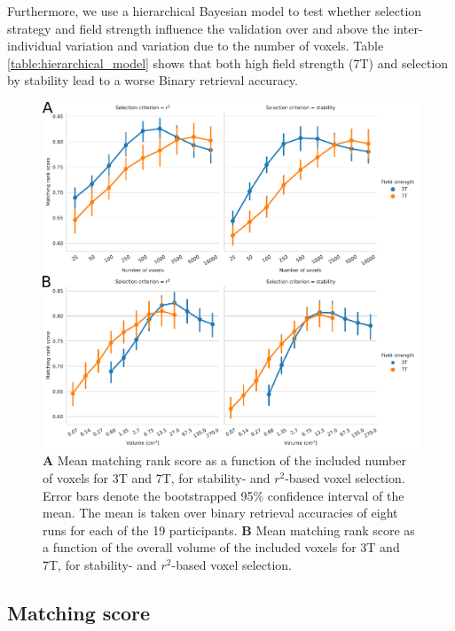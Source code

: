 Furthermore, we use a hierarchical Bayesian model to test whether selection strategy and field strength influence the validation over and above the inter-individual variation and variation due to the number of voxels.
Table \ref{table:hierarchical_model} shows that both high field strength (7T) and selection by stability lead to a worse Binary retrieval accuracy.

\begin{figure}
  \centering
    \includegraphics[width=\linewidth]{pics/rank.pdf}
	
  \caption{\textbf{A} Mean matching rank score as a function of the included number
  of voxels for 3T and 7T, for stability- and $r^2$-based voxel selection.
  Error bars denote the bootstrapped 95\% confidence interval of the mean. The
  mean is taken over binary retrieval accuracies of eight runs for each of the
  19 participants. \textbf{B} Mean matching rank score as a function of the overall
volume of the included voxels for 3T and 7T, for stability- and
$r^2$-based voxel selection.}

 \label{fig:matching_score}
\end{figure}

\subsection*{Matching score}

